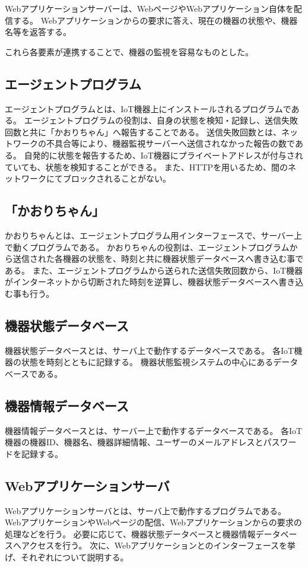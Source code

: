 Webアプリケーションサーバーは、WebページやWebアプリケーション自体を配信する。
Webアプリケーションからの要求に答え、現在の機器の状態や、機器名等を返答する。
\medskip

これら各要素が連携することで、機器の監視を容易なものとした。

\subsection{エージェントプログラム}
エージェントプログラムとは、IoT機器上にインストールされるプログラムである。
エージェントプログラムの役割は、自身の状態を検知・記録し、送信失敗回数と共に「かおりちゃん」へ報告することである。
送信失敗回数とは、ネットワークの不具合等により、機器監視サーバーへ送信されなかった報告の数である。
自発的に状態を報告するため、IoT機器にプライベートアドレスが付与されていても、状態を検知することができる。
また、HTTPを用いるため、間のネットワークにてブロックされることがない。

\subsection{「かおりちゃん」}
かおりちゃんとは、エージェントプログラム用インターフェースで、サーバー上で動くプログラムである。
かおりちゃんの役割は、エージェントプログラムから送信された各機器の状態を、時刻と共に機器状態データベースへ書き込む事である。
また、エージェントプログラムから送られた送信失敗回数から、IoT機器がインターネットから切断された時刻を逆算し、機器状態データベースへ書き込む事も行う。


\subsection{機器状態データベース}
機器状態データベースとは、サーバ上で動作するデータベースである。
各IoT機器の状態を時刻とともに記録する。
機器状態監視システムの中心にあるデータベースである。

\subsection{機器情報データベース}
機器情報データベースとは、サーバー上で動作するデータベースである。
各IoT機器の機器ID、機器名、機器詳細情報、ユーザーのメールアドレスとパスワードを記録する。

\subsection{Webアプリケーションサーバ}
Webアプリケーションサーバとは、サーバ上で動作するプログラムである。
WebアプリケーションやWebページの配信、Webアプリケーションからの要求の処理などを行う。
必要に応じて、機器状態データベースと機器情報データベースへアクセスを行う。
次に、Webアプリケーションとのインターフェースを挙げ、それぞれについて説明する。
